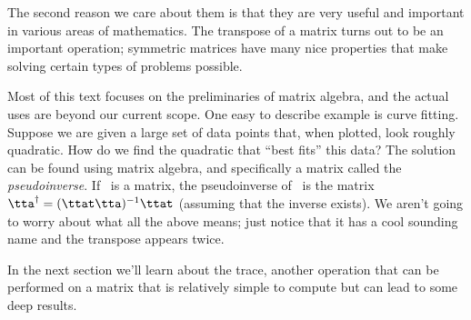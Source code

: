 The second reason we care about them is that they are very useful and important in various areas of mathematics. The transpose of a matrix turns out to be an important operation; symmetric matrices have many nice properties that make solving certain types of problems possible. 

Most of this text focuses on the preliminaries of matrix algebra, and the actual uses are beyond our current scope. One easy to describe example is curve fitting. Suppose we are given a large set of data points that, when plotted, look roughly quadratic. How do we find the quadratic that ``best fits'' this data? %
 The solution can be found using matrix algebra, and specifically a matrix called the \textit{pseudoinverse}. If \tta\ is a matrix, the pseudoinverse of \tta\ is the matrix $\tta^\dagger = (\ttat\tta)^{-1}\ttat$ (assuming that the inverse exists). We aren't going to worry about what all the above means; just notice that it has a cool sounding name and the transpose appears twice. 

In the next section we'll learn about the trace, another operation that can be performed on a matrix that is relatively simple to compute but can lead to some deep results.\\



	






